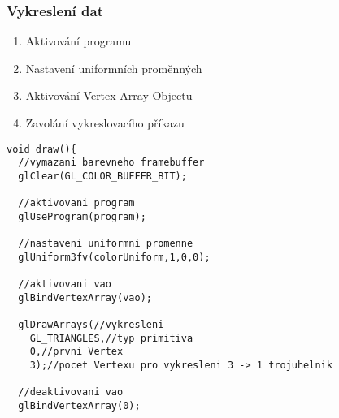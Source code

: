 \begin{frame}[fragile]
\frametitle{Vykreslení dat}
  \begin{enumerate}
  \item Aktivování programu
  \item Nastavení uniformních proměnných
  \item Aktivování Vertex Array Objectu
  \item Zavolání vykreslovacího příkazu
  \end{enumerate}
{\scriptsize
\begin{verbatim}
void draw(){
  //vymazani barevneho framebuffer
  glClear(GL_COLOR_BUFFER_BIT);

  //aktivovani program
  glUseProgram(program);

  //nastaveni uniformni promenne
  glUniform3fv(colorUniform,1,0,0);

  //aktivovani vao
  glBindVertexArray(vao);

  glDrawArrays(//vykresleni
    GL_TRIANGLES,//typ primitiva
    0,//prvni Vertex
    3);//pocet Vertexu pro vykresleni 3 -> 1 trojuhelnik

  //deaktivovani vao
  glBindVertexArray(0);
\end{verbatim}
}
\end{frame}

